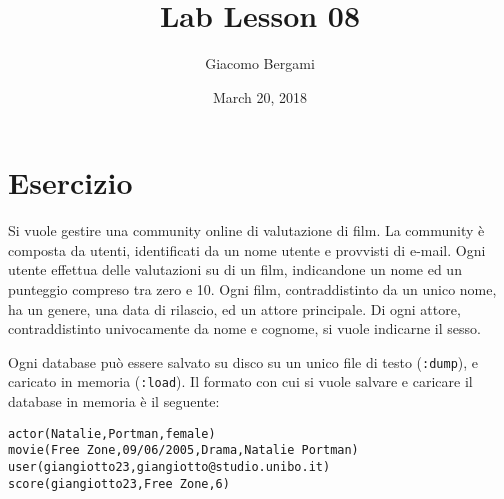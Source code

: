 \documentclass[]{scrartcl}
\title{Lab Lesson 08}
\date{March 20, 2018}
\author{Giacomo Bergami}
\begin{document}
\maketitle

\section*{Esercizio}

Si vuole gestire una community online di valutazione di film. La community è composta da utenti, identificati da un nome utente e provvisti di e-mail. Ogni utente effettua delle valutazioni su di un film, indicandone un nome ed un punteggio compreso tra zero e 10. Ogni film, contraddistinto da un unico nome, ha un genere, una data di rilascio, ed un attore principale. Di ogni attore, contraddistinto univocamente da nome e cognome, si vuole indicarne il sesso. 

Ogni database può essere salvato su disco su un unico file di testo (\texttt{:dump}), e caricato in memoria (\texttt{:load}). Il formato con cui si vuole salvare e caricare il database in memoria è il seguente:

\begin{verbatim}
actor(Natalie,Portman,female)
movie(Free Zone,09/06/2005,Drama,Natalie Portman)
user(giangiotto23,giangiotto@studio.unibo.it)
score(giangiotto23,Free Zone,6)
\end{verbatim}
\end{document}
